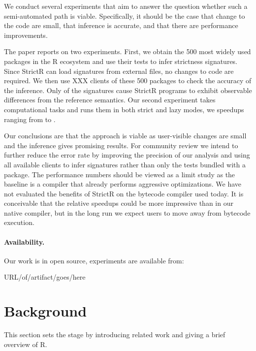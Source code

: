 \documentclass[review,creen,acmsmall]{acmart}
\newcommand{\strictr}{{\sf StrictR}\xspace}
\begin{document}
We conduct several experiments that aim to answer the question whether such a
semi-automated path is viable. Specifically, it should be the case that change
to the code are small, that inference is accurate, and that there are
performance improvements.

The paper reports on two experiments. First, we obtain the 500 most widely used
packages in the R ecosystem and use their tests to infer strictness signatures.
Since \strictr can load signatures from external files, no changes to code are
required. We then use XXX clients of these 500 packages to check the accuracy of
the inference. Only \robustnesResult of the signatures cause \strictr programs
to exhibit observable differences from the reference semantics. Our second
experiment takes computational tasks and runs them in both strict and lazy
modes, we speedups ranging from \speedupRshStrictMin to \speedupRshStrictMax.

Our conclusions are that the approach is viable as user-visible changes are
small and the inference gives promising results. For community review we intend
to further reduce the error rate by improving the precision of our analysis and
using all available clients to infer signatures rather than only the tests
bundled with a package. The performance numbers should be viewed as a limit
study as the baseline is a compiler that already performs aggressive
optimizations. We have not evaluated the benefits of \strictr on the bytecode
compiler used today. It is conceivable that the relative speedups could be more
impressive than in our native compiler, but in the long run we expect users
to move away from bytecode execution.

\paragraph{Availability.} Our work is in open source,
  experiments are available from:\\

  \begin{center}
    URL/of/artifact/goes/here
\end{center}

\section{Background}\label{sec:background}

This section sets the stage by introducing related work and giving a brief
overview of R.
\end{document}
